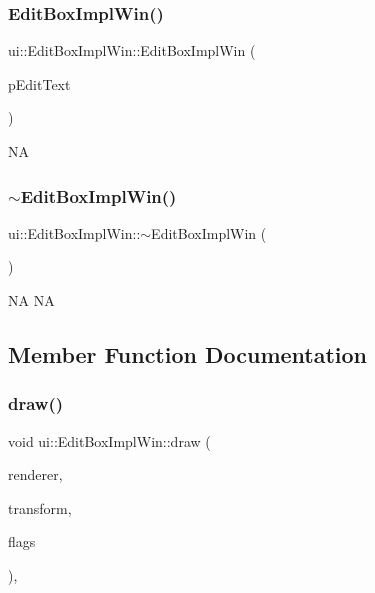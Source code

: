\subsubsection{\texorpdfstring{Edit\+Box\+Impl\+Win()}{EditBoxImplWin()}}
{\footnotesize\ttfamily ui\+::\+Edit\+Box\+Impl\+Win\+::\+Edit\+Box\+Impl\+Win (\begin{DoxyParamCaption}\item[{\hyperlink{classui_1_1EditBox}{Edit\+Box} $\ast$}]{p\+Edit\+Text }\end{DoxyParamCaption})}

NA \mbox{\label{classui_1_1EditBoxImplWin_abde4dd2c0eba107acb9a4c9abd598997}} 
\subsubsection{\texorpdfstring{$\sim$\+Edit\+Box\+Impl\+Win()}{~EditBoxImplWin()}}
{\footnotesize\ttfamily ui\+::\+Edit\+Box\+Impl\+Win\+::$\sim$\+Edit\+Box\+Impl\+Win (\begin{DoxyParamCaption}{ }\end{DoxyParamCaption})\hspace{0.3cm}{\ttfamily [virtual]}}

NA  NA 

\subsection{Member Function Documentation}
\mbox{\label{classui_1_1EditBoxImplWin_a8709f6415ecea16cd9a09eb3fddc2d6a}} 
\subsubsection{\texorpdfstring{draw()}{draw()}}
{\footnotesize\ttfamily void ui\+::\+Edit\+Box\+Impl\+Win\+::draw (\begin{DoxyParamCaption}\item[{\hyperlink{classRenderer}{Renderer} $\ast$}]{renderer,  }\item[{const \hyperlink{classMat4}{Mat4} \&}]{transform,  }\item[{uint32\+\_\+t}]{flags }\end{DoxyParamCaption})\hspace{0.3cm}{\ttfamily [override]}, {\ttfamily [virtual]}}

